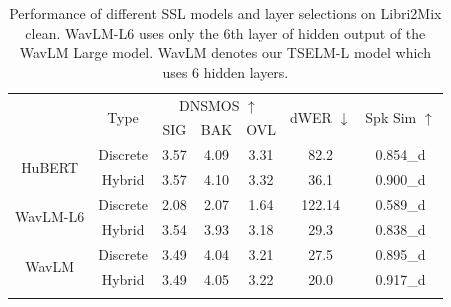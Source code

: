\documentclass[conference]{IEEEtran}
\begin{document}
  \begin{table}
    \caption{Performance of different SSL models and layer selections on Libri2Mix clean. WavLM-L6 uses only the 6th layer of hidden output of the WavLM Large model. WavLM denotes our TSELM-L model which uses 6 hidden layers. 
            }
            \vspace{-15pt}
    \renewcommand{\arraystretch}{1.1}
    \begin{center}
      \setlength{\tabcolsep}{5pt}
        \begin{tabular}{ccccccc}
            \Xhline{2\arrayrulewidth} %
            \multirow{2}{*}{SSL-Model} & \multirow{2}{*}{Type} & \multicolumn{3}{c}{ DNSMOS $\uparrow$} & \multirow{2}{*}{dWER $\downarrow$} & \multirow{2}{*}{Spk Sim $\uparrow$} \\
            \cline{3-5}
                                                       &                             & SIG     & BAK     & OVL    &                       &                          \\ 
            \hline
            \multirow{2}{*}{HuBERT}                              &  Discrete                          & 3.57    & 4.09    & 3.31   & 82.2                & 0.854\_d                        \\
                                             &  Hybrid                          & 3.57    & 4.10    & 3.32   & 36.1                & 0.900\_d                        \\
            \hline
            \multirow{2}{*}{WavLM-L6}                              &  Discrete                          & 2.08    & 2.07    & 1.64   & 122.14                & 0.589\_d                        \\
            &  Hybrid                          & 3.54    & 3.93    & 3.18   & 29.3                & 0.838\_d                        \\
            \hline
            \multirow{2}{*}{WavLM}                                     &  Discrete                          & 3.49    & 4.04    & 3.21   & 27.5                & 0.895\_d                        \\
                                              &  Hybrid                          & 3.49    & 4.05    & 3.22   & 20.0                & 0.917\_d                        \\
            
            \Xhline{2\arrayrulewidth} %
            \end{tabular}
            \linebreak
            \label{hubert_wavlm_6}
      \end{center}
      \vspace{-8pt}
    \end{table}
\end{document}
